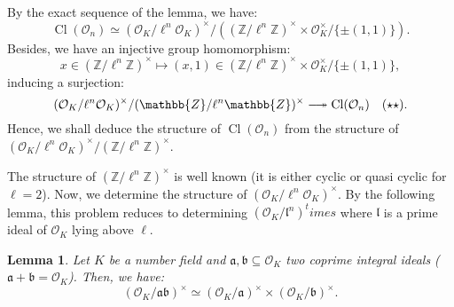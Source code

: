 \documentclass[a4paper,10pt]{report}
\theoremstyle{definition}
\theoremstyle{plain}
\newtheorem{Lemma}[Definition]{Lemma}
\theoremstyle{definition}
\newcommand{\Z}{\mathbb{Z}}
\newcommand{\mO}{\mathcal{O}}
\renewcommand{\(}{\left(}
\renewcommand{\)}{\right)}
\newcommand{\mf}[1]{\mathfrak{#1}}
\DeclareMathOperator{\Cl}{Cl}
\begin{document}
By the exact sequence of the lemma, we have:
\[\Cl(\mO_n)\simeq (\mO_K/\ell^n\mO_K)^\times/((\Z/\ell^n\Z)^\times\times \mO_K^\times/\{\pm(1,1)\}).\]
Besides, we have an injective group homomorphism:
\[x\in(\Z/\ell^n\Z)^\times\longmapsto (x,1)\in (\Z/\ell^n\Z)^\times\times \mO_K^\times/\{\pm(1,1)\},\]
inducing a surjection:
\[(\mO_K/\ell^n\mO_K)^\times/(\Z/\ell^n\Z)^\times\relbar\joinrel\twoheadrightarrow \Cl(\mO_n) \quad (\star\star).\]
Hence, we shall deduce the structure of $\Cl(\mO_n)$ from the structure of $(\mO_K/\ell^n\mO_K)^\times/(\Z/\ell^n\Z)^\times$.

The structure of $(\Z/\ell^n\Z)^\times$ is well known (it is either cyclic or quasi cyclic for $\ell=2$). Now, we determine the structure of $(\mO_K/\ell^n\mO_K)^\times$. By the following lemma, this problem reduces to determining $(\mO_K/\mf{l}^n)^times$ where $\mf{l}$ is a prime ideal of $\mO_K$ lying above $\ell$.

\begin{Lemma}\label{Lemma 14}
Let $K$ be a number field and $\mf{a}, \mf{b}\subseteq \mO_K$ two coprime integral ideals ($\mf{a}+\mf{b}=\mO_K$). Then, we have:
\[(\mO_K/\mf{a}\mf{b})^\times\simeq(\mO_K/\mf{a})^\times\times(\mO_K/\mf{b})^\times.\] 
\end{Lemma}
\end{document}
